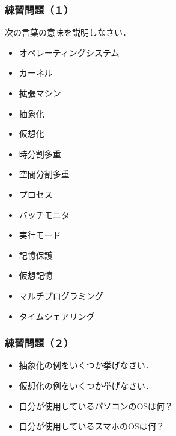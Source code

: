 \documentclass[unicode]{beamer}                   %
\begin{document}
\begin{frame}
  \frametitle{練習問題（１）}
  次の言葉の意味を説明しなさい．
  \begin{itemize}
    \item オペレーティングシステム
    \item カーネル
    \item 拡張マシン
    \item 抽象化
    \item 仮想化
    \item 時分割多重
    \item 空間分割多重
    \item プロセス
    \item バッチモニタ
    \item 実行モード
    \item 記憶保護
    \item 仮想記憶
    \item マルチプログラミング
    \item タイムシェアリング
  \end{itemize}
  \vfill
\end{frame}

\begin{frame}
  \frametitle{練習問題（２）}
  \begin{itemize}
    \item 抽象化の例をいくつか挙げなさい．
      \vfill
    \item 仮想化の例をいくつか挙げなさい．
      \vfill
    \item 自分が使用しているパソコンのOSは何？
      \vfill
    \item 自分が使用しているスマホのOSは何？
      \vfill
  \end{itemize}
  \vfill
\end{frame}
\end{document}
